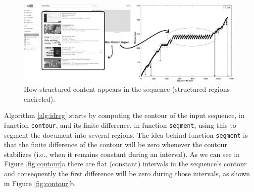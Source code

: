 \documentclass{vldb}
\begin{document}
\begin{figure}[h]
  \centering
     \includegraphics[width=\textwidth]{img/main-reg.jpg}
  \caption{How structured content appears in the sequence (structured regions encircled).}
  \label{fig:stru}
\end{figure}

Algorithm \ref{alg:idreg} starts by computing the contour of the input sequence,
in function \texttt{contour}, and its finite difference, in function
\texttt{segment}, using this to segment the document into several regions.
The idea behind function \texttt{segment} is that the finite difference of
the contour will be zero whenever the contour stabilizes (i.e., when it
remains constant during an interval). As we can see in Figure
\ref{fig:contour}a there are flat (constant) intervals in the sequence's
contour and consequently the first difference will be zero during those
intervals, as shown in Figure \ref{fig:contour}b.
\end{document}
